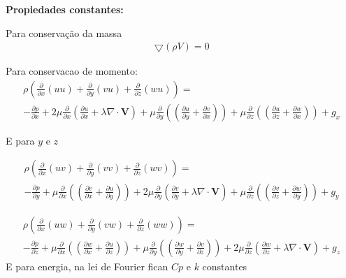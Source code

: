 \documentclass[]{article}
\begin{document}
\textbf{Propiedades constantes:}

Para conservação da massa
\begin{equation}
	\begin{aligned}
		\bigtriangledown (\rho V)= 0 
	\end{aligned}
\end{equation}

Para conservacao de momento:
\begin{equation}
	\begin{aligned}
		\rho(\frac{\partial}{\partial x} ( u u) + \frac{\partial}{\partial y} (v u) + \frac{\partial}{\partial z} (w u) )= \\
		- \frac{\partial p}{\partial x} +2 \mu \frac{\partial}{\partial x} \left(  \frac{\partial u}{\partial x} + \lambda \nabla \cdot \mathbf{V} \right) + \mu
		\frac{\partial}{\partial y} \left(  \left( \frac{\partial u}{\partial y} + \frac{\partial v}{\partial x} \right) \right) + \mu
		\frac{\partial}{\partial z} \left(  \left( \frac{\partial u}{\partial z} + \frac{\partial w}{\partial x} \right) \right) + g_x
	\end{aligned}
\end{equation}

E para $y$ e $z$

\begin{equation}
	\begin{aligned}
		\rho(\frac{\partial}{\partial x} ( u v) + \frac{\partial}{\partial y} ( v v) + \frac{\partial}{\partial z} ( w v)) = \\
		- \frac{\partial p}{\partial y} + \mu \frac{\partial}{\partial x} \left(  \left( \frac{\partial v}{\partial x} + \frac{\partial u}{\partial y} \right) \right) + 2 \mu
		\frac{\partial}{\partial y} \left(  \frac{\partial v}{\partial y} + \lambda \nabla \cdot \mathbf{V} \right) +\mu
		\frac{\partial}{\partial z} \left(  \left( \frac{\partial v}{\partial z} + \frac{\partial w}{\partial y} \right) \right) +  g_y
	\end{aligned}
\end{equation}

\begin{equation}
	\begin{aligned}
		\rho(\frac{\partial}{\partial x} ( u w) + \frac{\partial}{\partial y} ( v w) + \frac{\partial}{\partial z} ( w w)) = \\
		- \frac{\partial p}{\partial z} + \mu \frac{\partial}{\partial x} \left(  \left( \frac{\partial w}{\partial x} + \frac{\partial u}{\partial z} \right) \right) + \mu
		\frac{\partial}{\partial y} \left(  \left( \frac{\partial w}{\partial y} + \frac{\partial v}{\partial z} \right) \right) + 2 \mu
		\frac{\partial}{\partial z} \left(  \frac{\partial w}{\partial z} + \lambda \nabla \cdot \mathbf{V} \right) +  g_z
	\end{aligned}
\end{equation}
E para energia, na lei de Fourier fican $Cp$ e $k$ constantes
\end{document}
